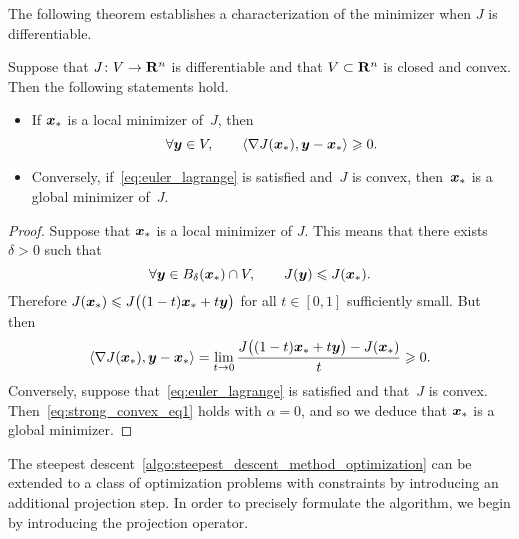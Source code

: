 The following theorem establishes a characterization of the minimizer when $J$ is differentiable.
\begin{theorem}
    \label{theorem:euler_lagrange}
    Suppose that $J\colon V \to \mathbf R^n$ is differentiable and
    that $V \subset \mathbf R^n$ is closed and convex.
    Then the following statements hold.
    \begin{itemize}
        \item
            If $\mathbf{\boldsymbol{x}}_*$ is a local minimizer of~$J$,
            then
            \begin{equation}
                \label{eq:euler_lagrange}
                \forall \mathbf{\boldsymbol{y}} \in V,
                \qquad \langle\nabla J(\mathbf{\boldsymbol{x}}_*), \mathbf{\boldsymbol{y}} - \mathbf{\boldsymbol{x}}_*\rangle \geqslant 0.
            \end{equation}

        \item
            Conversely, if~\eqref{eq:euler_lagrange} is satisfied and~$J$ is convex,
            then~$\mathbf{\boldsymbol{x}}_*$ is a global minimizer of~$J$.
    \end{itemize}
\end{theorem}
\begin{proof}
    Suppose that $\mathbf{\boldsymbol{x}}_*$ is a local minimizer of $J$.
    This means that there exists~$\delta > 0$ such that
    \[
        \forall \mathbf{\boldsymbol{y}} \in B_{\delta}(\mathbf{\boldsymbol{x}}_*) \cap V, \qquad
        J(\mathbf{\boldsymbol{y}}) \leqslant J(\mathbf{\boldsymbol{x}}_*).
    \]
    Therefore $J(\mathbf{\boldsymbol{x}}_*) \leqslant J\bigl((1-t)\mathbf{\boldsymbol{x}}_* + t \mathbf{\boldsymbol{y}}\bigr)$ for all $t \in [0, 1]$ sufficiently small.
    But then
    \[
        \langle\nabla J(\mathbf{\boldsymbol{x}}_*), \mathbf{\boldsymbol{y}} - \mathbf{\boldsymbol{x}}_*\rangle
        = \lim_{t \to 0} \frac{ J\bigl((1-t)\mathbf{\boldsymbol{x}}_* + t \mathbf{\boldsymbol{y}}\bigr)  - J(\mathbf{\boldsymbol{x}}_*)}{t} \geqslant 0.
    \]
    Conversely, suppose that~\eqref{eq:euler_lagrange} is satisfied and that~$J$ is convex.
    Then~\eqref{eq:strong_convex_eq1} holds with $\alpha = 0$,
    and so we deduce that $\mathbf{\boldsymbol{x}}_*$ is a global minimizer.
\end{proof}

The steepest descent~\cref{algo:steepest_descent_method_optimization} can be extended to a class of optimization problems with constraints by introducing an additional projection step.
In order to precisely formulate the algorithm,
we begin by introducing the projection operator.

